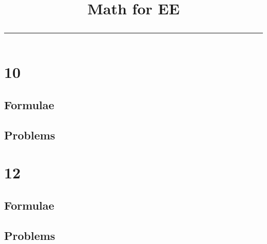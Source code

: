 \documentclass{article}
\begin{document}

\onecolumn


\title{
	\begin{center}
	Math for EE
	\\
\rule{0.4\columnwidth}{0.4pt}
\end{center}
}

\tableofcontents

\newpage
\onecolumn


\renewcommand{\thetable}{\theenumi}

\section{10}
\subsection{Formulae}

\newpage
\subsection{Problems}

\newpage
\section{12}
\subsection{Formulae}

\newpage
\subsection{Problems}

\end{document}
